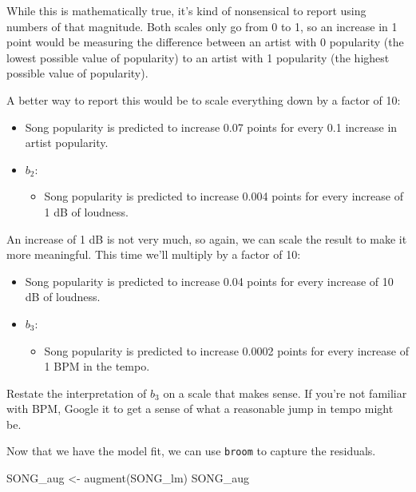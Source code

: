 \documentclass[
]{book}
\newenvironment{Shaded}{\begin{snugshade}}{\end{snugshade}}
\newcommand{\FunctionTok}[1]{\textcolor[rgb]{0.00,0.00,0.00}{#1}}
\newcommand{\NormalTok}[1]{#1}
\newcommand{\OtherTok}[1]{\textcolor[rgb]{0.56,0.35,0.01}{#1}}
\providecommand{\tightlist}{%
  \setlength{\itemsep}{0pt}\setlength{\parskip}{0pt}}
\begin{document}
While this is mathematically true, it's kind of nonsensical to report using numbers of that magnitude. Both scales only go from 0 to 1, so an increase in 1 point would be measuring the difference between an artist with 0 popularity (the lowest possible value of popularity) to an artist with 1 popularity (the highest possible value of popularity).

A better way to report this would be to scale everything down by a factor of 10:

\begin{itemize}
\item
  Song popularity is predicted to increase 0.07 points for every 0.1 increase in artist popularity.
\item
  \(b_{2}\):

  \begin{itemize}
  \tightlist
  \item
    Song popularity is predicted to increase 0.004 points for every increase of 1 dB of loudness.
  \end{itemize}
\end{itemize}

An increase of 1 dB is not very much, so again, we can scale the result to make it more meaningful. This time we'll multiply by a factor of 10:

\begin{itemize}
\item
  Song popularity is predicted to increase 0.04 points for every increase of 10 dB of loudness.
\item
  \(b_{3}\):

  \begin{itemize}
  \tightlist
  \item
    Song popularity is predicted to increase 0.0002 points for every increase of 1 BPM in the tempo.
  \end{itemize}
\end{itemize}

Restate the interpretation of \(b_{3}\) on a scale that makes sense. If you're not familiar with BPM, Google it to get a sense of what a reasonable jump in tempo might be.

Now that we have the model fit, we can use \texttt{broom} to capture the residuals.

\begin{Shaded}
\begin{Highlighting}[]
\NormalTok{SONG\_aug }\OtherTok{\textless{}{-}} \FunctionTok{augment}\NormalTok{(SONG\_lm)}
\NormalTok{SONG\_aug}
\end{Highlighting}
\end{Shaded}
\end{document}
